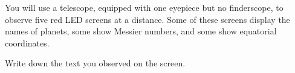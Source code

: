 You will use a telescope, equipped with one eyepiece but no finderscope, to
observe five red LED screens at a distance. Some of these screens display
the names of planets, some show Messier numbers, and some show equatorial
coordinates.

Write down the text you observed on the screen.
